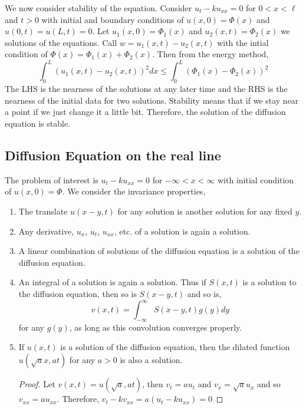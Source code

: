 
We now consider stability of the equation. Consider $u_t - ku_{xx} = 0$ for $0 < x <\ell$ and $t > 0$ with initial and boundary conditions of $u(x, 0) = \Phi(x)$ and $u(0, t) = u(L, t) = 0$. Let $u_1(x, 0) = \Phi_1(x)$ and $u_2(x, t) = \Phi_2(x)$ we solutions of the equations. Call $w = u_1(x, t) - u_2(x, t)$ with the intial condition of $\Phi(x) = \Phi_1(x) + \Phi_2(x)$. Then from the energy method,
$$ \int_0^L \left(u_1(x, t) - u_2(x,t)\right)^2 dx \le \int_0^L \left( \Phi_1(x) - \Phi_2(x)\right)^2 $$
The LHS is the nearness of the solutions at any later time and the RHS is the nearness of the initial data for two solutions. Stability means that if we stay near a point if we just change it a little bit. Therefore, the solution of the diffusion equation is stable. \\

\noindent
\subsection{Diffusion Equation on the real line}
The problem of interest is $u_t - ku_{xx} = 0$ for $-\infty < x < \infty$ with initial condition of $u(x, 0) = \Phi$. We consider the invariance properties,
\begin{enumerate}
  \item The translate $u(x - y, t)$ for any solution is another solution for any fixed $y$.
  \item Any derivative, $u_x$, $u_t$, $u_{xx}$, etc. of a solution is again a solution.
  \item A linear combination of solutions of the diffusion equation is a solution of the diffusion equation.
  \item An integral of a solution is again a solution. Thus if $S(x, t)$ is a solution to the diffusion equation, then so is $S(x - y, t)$ and so is,
  $$ v(x, t) = \int_{-\infty}^\infty S(x-y, t)g(y)dy $$
  for any $g(y)$, as long as this convolution converges properly.
  \item If $u(x, t)$ is a solution of the diffusion equation, then the dilated function $u(\sqrt a x, at)$ for any $a > 0$ is also a solution.
  \begin{proof}
    Let $v(x, t) = u(\sqrt a, at)$, then $v_t = au_t$ and $v_{x} = \sqrt a u_x$ and so $v_{xx} = au_{xx}$. Therefore, $v_t - kv_{xx} = a(u_t - ku_{xx}) = 0$
  \end{proof}
\end{enumerate}

